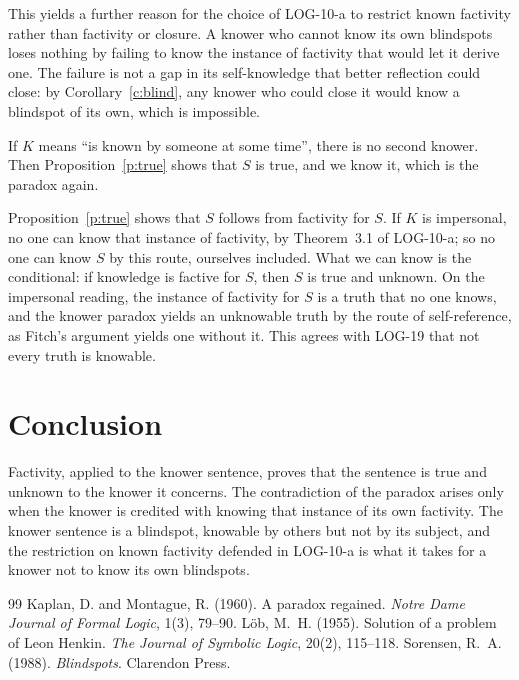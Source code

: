 \documentclass{situationist-preprint}
\begin{document}
This yields a further reason for the choice of LOG-10-a to restrict known factivity rather than factivity or closure. A knower who cannot know its own blindspots loses nothing by failing to know the instance of factivity that would let it derive one. The failure is not a gap in its self-knowledge that better reflection could close: by Corollary~\ref{c:blind}, any knower who could close it would know a blindspot of its own, which is impossible.

\begin{objection}
If $K$ means \enquote{is known by someone at some time}, there is no second knower. Then Proposition~\ref{p:true} shows that $S$ is true, and we know it, which is the paradox again.
\end{objection}

\begin{reply}
Proposition~\ref{p:true} shows that $S$ follows from factivity for $S$. If $K$ is impersonal, no one can know that instance of factivity, by Theorem~3.1 of LOG-10-a; so no one can know $S$ by this route, ourselves included. What we can know is the conditional: if knowledge is factive for $S$, then $S$ is true and unknown. On the impersonal reading, the instance of factivity for $S$ is a truth that no one knows, and the knower paradox yields an unknowable truth by the route of self-reference, as Fitch's argument yields one without it. This agrees with LOG-19 that not every truth is knowable.
\end{reply}

\section{Conclusion}

Factivity, applied to the knower sentence, proves that the sentence is true and unknown to the knower it concerns. The contradiction of the paradox arises only when the knower is credited with knowing that instance of its own factivity. The knower sentence is a blindspot, knowable by others but not by its subject, and the restriction on known factivity defended in LOG-10-a is what it takes for a knower not to know its own blindspots.

\begin{thebibliography}{99}\small
{} Kaplan, D. and Montague, R. (1960). A paradox regained. \emph{Notre Dame Journal of Formal Logic}, 1(3), 79--90.
 Löb, M.~H. (1955). Solution of a problem of Leon Henkin. \emph{The Journal of Symbolic Logic}, 20(2), 115--118.
 Sorensen, R.~A. (1988). \emph{Blindspots}. Clarendon Press.
\end{thebibliography}
\end{document}
